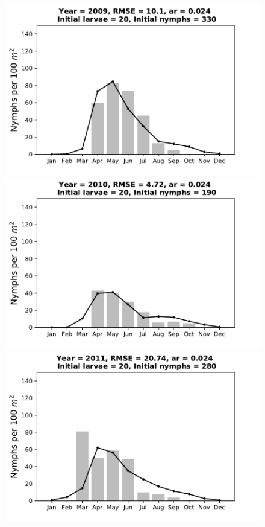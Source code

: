 \documentclass[a4paper, 11pt]{scrartcl}
\begin{document}
\begin{figure}[h!]
\centering
\begin{minipage}[c]{0.40\linewidth}
\includegraphics[width=\linewidth]{figures/s4/S4_2009}
\end{minipage}
\begin{minipage}[c]{0.40\linewidth}
\includegraphics[width=\linewidth]{figures/s4/S4_2010}
\end{minipage}
\begin{minipage}[c]{0.40\linewidth}
\includegraphics[width=\linewidth]{figures/s4/S4_2011}

\end{minipage}
\end{figure}
\end{document}

